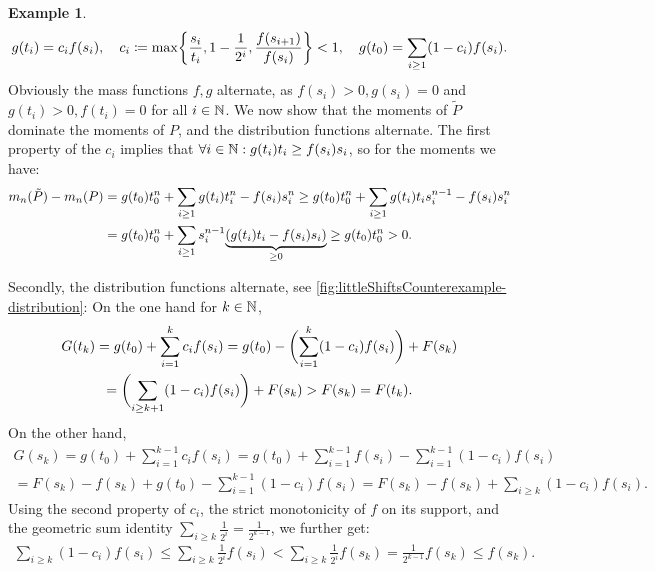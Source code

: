 \documentclass[a4paper,DIV=11]{scrreprt}
\theoremstyle{definition}
\newtheorem{ex}[thm]{Example} %
\begin{document}
\begin{ex}
        \begin{gather*}
            g(t_i) = c_i f(s_i), \quad
            c_i \coloneqq \max\biggset{\frac{s_i}{t_i}, 1-\frac{1}{2^i}, \frac{f(s_{i+1})}{f(s_i)}} < 1, \quad
            g(t_0) = \sum_{i \geq 1} (1-c_i) f(s_i).
        \end{gather*}
        Obviously the mass functions $f, g$ alternate, as $f(s_i) > 0, g(s_i) = 0$ and $g(t_i) > 0, f(t_i) = 0$ for all $i \in \N$. We now show that the moments of $\tilde{P}$ dominate the moments of $P$, and the distribution functions alternate.
        The first property of the $c_i$ implies that $\forall i \in \N: g(t_i)t_i  \geq  f(s_i)s_i$, so for the moments we have:
        \begin{multline*}
            m_n(\tilde{P}) - m_n(P)
            = g(t_0)t_0^n + \sum_{i \geq 1} g(t_i) t_i^n - f(s_i) s_i^n
            \geq g(t_0)t_0^n + \sum_{i \geq 1} g(t_i) t_i s_i^{n-1} - f(s_i) s_i^n  \\
            = g(t_0)t_0^n + \sum_{i \geq 1} s_i^{n-1} \undersetbrace{(g(t_i)t_i - f(s_i)s_i)}{\geq 0}
            \geq g(t_0)t_0^n > 0.
        \end{multline*}
        
        Secondly, the distribution functions alternate, see \autoref{fig:littleShiftsCounterexample-distribution}: On the one hand for $k \in \N$, 
        \begin{multline*}
            G(t_k) 
            = g(t_0) + \sum_{i=1}^k c_i f(s_i) 
            = g(t_0) - \biggpars{\sum_{i=1}^k (1-c_i)f(s_i)} + F(s_k) \\
            = \biggpars{\sum_{i \geq k+1} (1-c_i)f(s_i)} + F(s_k) > F(s_k) = F(t_k).
        \end{multline*}
        On the other hand, 
        \begin{multline*}
            G(s_k)
            = g(t_0) + \sum_{i=1}^{k-1} c_i f(s_i) 
            = g(t_0) + \sum_{i=1}^{k-1} f(s_i) - \sum_{i=1}^{k-1} (1-c_i) f(s_i) \\
            = F(s_k) - f(s_k) + g(t_0) - \sum_{i=1}^{k-1} (1-c_i) f(s_i)  
            = F(s_k) - f(s_k) + \sum_{i \geq k} (1-c_i) f(s_i).
        \end{multline*}
        Using the second property of $c_i$, the strict monotonicity of $f$ on its support, and the geometric sum identity $\sum_{i \geq k} \frac{1}{2^i} = 
        \frac{1}{2^{k-1}}$, we further get:
        \begin{gather*}
            \sum_{i \geq k} (1-c_i)f(s_i) \leq \sum_{i \geq k} \frac{1}{2^i} f(s_i) < \sum_{i \geq k} \frac{1}{2^i} f(s_k) = \frac{1}{2^{k-1}} f(s_k) \leq f(s_k).
        \end{gather*}
        

\end{ex}
\end{document}
